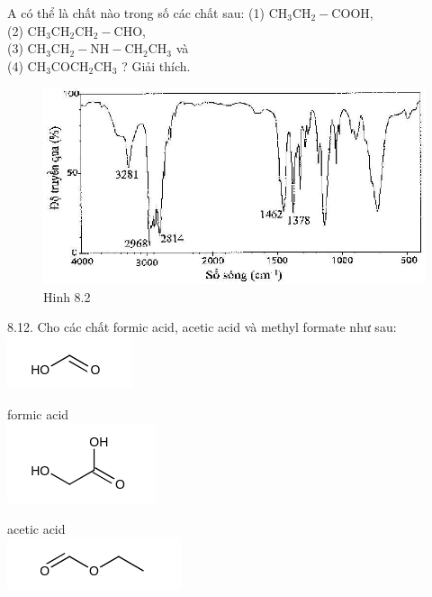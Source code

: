 \documentclass[10pt]{article}
\begin{document}
A có thể là chất nào trong số các chất sau: (1) $\mathrm{CH}_{3} \mathrm{CH}_{2}-\mathrm{COOH}$,\\
(2) $\mathrm{CH}_{3} \mathrm{CH}_{2} \mathrm{CH}_{2}-\mathrm{CHO}$,\\
(3) $\mathrm{CH}_{3} \mathrm{CH}_{2}-\mathrm{NH}-\mathrm{CH}_{2} \mathrm{CH}_{3}$ và\\
(4) $\mathrm{CH}_{3} \mathrm{COCH}_{2} \mathrm{CH}_{3}$ ? Giải thích.

\begin{figure}[h]
\begin{center}
  \includegraphics[width=\textwidth]{2025_10_23_f2823ef970776205e47bg-26(1)}
\captionsetup{labelformat=empty}
\caption{Hinh 8.2}
\end{center}
\end{figure}

8.12. Cho các chất formic acid, acetic acid và methyl formate như sau:\\
\includegraphics{smile-2aa327f244c1662e2030456916cea4258aa5ab28}

formic acid\\
\includegraphics{smile-bf9b9b09ab11bd5b2037ea7732a857470cf09070}

acetic acid\\
\includegraphics{smile-86eb5a2ef6166ef155757de0821cb72a048d9649}
\end{document}
